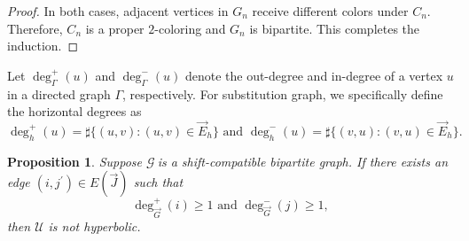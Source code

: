 \documentclass[reqno]{amsart}
\theoremstyle{plain}
\newtheorem{proposition}{Proposition}
\numberwithin{equation}{section}
\begin{document}
\begin{proof}
In both cases, adjacent vertices in $G_{n}$ receive different colors under $%
C_{n}$. Therefore, $C_{n}$ is a proper $2$-coloring and $G_{n}$ is
bipartite. This completes the induction.
\end{proof}

Let $\deg _{\Gamma }^{+}(u)$ and $\deg _{\Gamma }^{-}(u)$ denote the
out-degree and in-degree of a vertex $u$ in a directed graph $\Gamma $,
respectively. For substitution graph, we specifically define the horizontal
degrees as 
\begin{equation*}
\deg _{h}^{+}(u)=\sharp \{(u,v):(u,v)\in \vec{E}_{h}\}\text{ and }\deg
_{h}^{-}(u)=\sharp \{(v,u):(v,u)\in \vec{E}_{h}\}.
\end{equation*}

\begin{proposition}
\label{prop-bi}Suppose $\mathcal{G}\ $is a shift-compatible bipartite graph.
If there exists an edge $(i,j^{\prime })\in E(\overrightarrow{J})$ such that%
\begin{equation*}
\deg _{\overrightarrow{G}}^{+}(i)\geq 1\text{ and }\deg _{\overrightarrow{G}%
}^{-}(j)\geq 1,
\end{equation*}%
then $\mathcal{U}$ is not hyperbolic.
\end{proposition}
\end{document}
